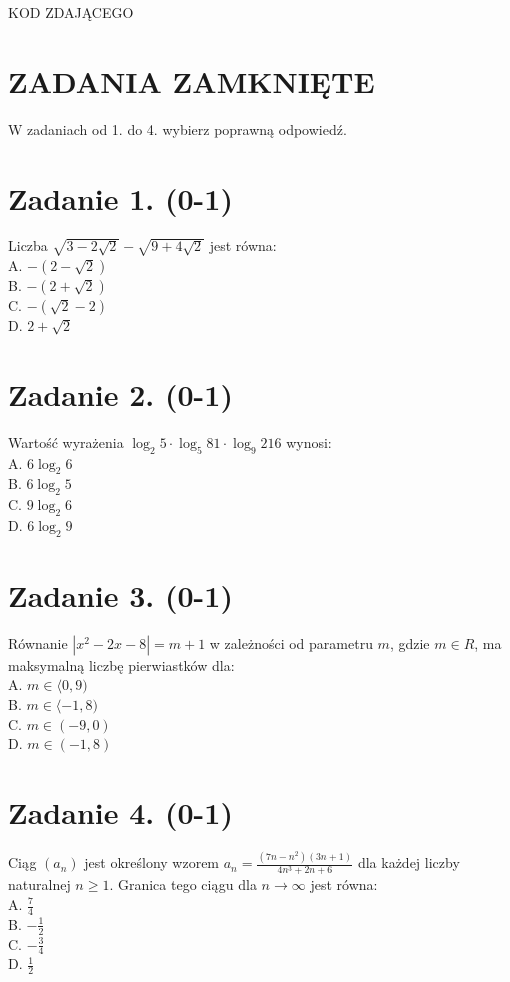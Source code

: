 \documentclass[10pt]{article}
\begin{document}
KOD ZDAJĄCEGO

\section*{ZADANIA ZAMKNIĘTE}
W zadaniach od 1. do 4. wybierz poprawną odpowiedź.

\section*{Zadanie 1. (0-1)}
Liczba \(\sqrt{3-2 \sqrt{2}}-\sqrt{9+4 \sqrt{2}}\) jest równa:\\
A. \(-(2-\sqrt{2})\)\\
B. \(-(2+\sqrt{2})\)\\
C. \(-(\sqrt{2}-2)\)\\
D. \(2+\sqrt{2}\)

\section*{Zadanie 2. (0-1)}
Wartość wyrażenia \(\log _{2} 5 \cdot \log _{5} 81 \cdot \log _{9} 216\) wynosi:\\
A. \(6 \log _{2} 6\)\\
B. \(6 \log _{2} 5\)\\
C. \(9 \log _{2} 6\)\\
D. \(6 \log _{2} 9\)

\section*{Zadanie 3. (0-1)}
Równanie \(\left|x^{2}-2 x-8\right|=m+1\) w zależności od parametru \(m\), gdzie \(m \in R\), ma maksymalną liczbę pierwiastków dla:\\
A. \(m \in\langle 0,9)\)\\
B. \(m \in\langle-1,8)\)\\
C. \(m \in(-9,0)\)\\
D. \(m \in(-1,8)\)

\section*{Zadanie 4. (0-1)}
Ciąg \(\left(a_{n}\right)\) jest określony wzorem \(a_{n}=\frac{\left(7 n-n^{2}\right)(3 n+1)}{4 n^{3}+2 n+6}\) dla każdej liczby naturalnej \(n \geq 1\). Granica tego ciągu dla \(n \rightarrow \infty\) jest równa:\\
A. \(\frac{7}{4}\)\\
B. \(-\frac{1}{2}\)\\
C. \(-\frac{3}{4}\)\\
D. \(\frac{1}{2}\)
\end{document}
